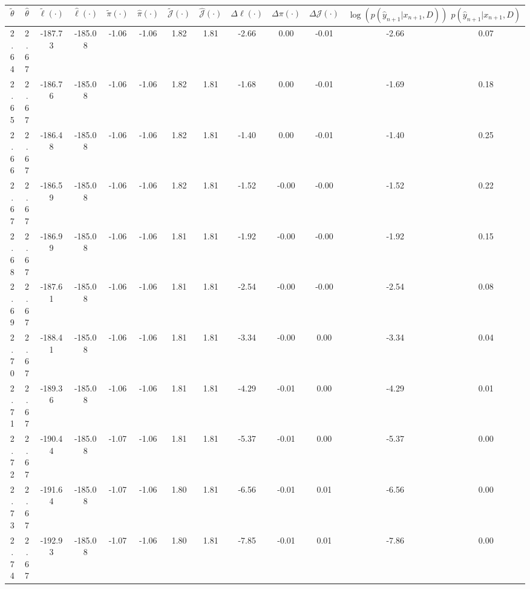 \begin{table}[htbp]
        \centering
        \tiny
        \begin{adjustbox}{angle=90}
            \begin{tabular}{|c|c|c|c|c|c|c|c|c|c|c|c|c|}
                \hline
                 $\tilde{\theta}$ & $\hat{\theta}$ & $\tilde{\ell}(\cdot)$ & $\hat{\ell}(\cdot)$ & $\tilde{\pi}(\cdot)$ & $\hat{\pi}(\cdot)$ & $\tilde{\mathcal{J}}(\cdot)$ & $\hat{\mathcal{J}}(\cdot)$ & $\Delta \ell(\cdot)$ & $\Delta \pi(\cdot)$ & $\Delta \mathcal{J}(\cdot)$ & $\log(p(\hat{y}_{n+1}|x_{n+1}, D))$ & $p(\hat{y}_{n+1}|x_{n+1}, D)$ \\
                \hline
                 2.64 & 2.67 & -187.73 & -185.08 & -1.06 & -1.06 & 1.82 & 1.81 & -2.66 & 0.00 & -0.01 & -2.66 & 0.07\\ \hline
 2.65 & 2.67 & -186.76 & -185.08 & -1.06 & -1.06 & 1.82 & 1.81 & -1.68 & 0.00 & -0.01 & -1.69 & 0.18\\ \hline
 2.66 & 2.67 & -186.48 & -185.08 & -1.06 & -1.06 & 1.82 & 1.81 & -1.40 & 0.00 & -0.01 & -1.40 & 0.25\\ \hline
 2.67 & 2.67 & -186.59 & -185.08 & -1.06 & -1.06 & 1.82 & 1.81 & -1.52 & -0.00 & -0.00 & -1.52 & 0.22\\ \hline
 2.68 & 2.67 & -186.99 & -185.08 & -1.06 & -1.06 & 1.81 & 1.81 & -1.92 & -0.00 & -0.00 & -1.92 & 0.15\\ \hline
 2.69 & 2.67 & -187.61 & -185.08 & -1.06 & -1.06 & 1.81 & 1.81 & -2.54 & -0.00 & -0.00 & -2.54 & 0.08\\ \hline
 2.70 & 2.67 & -188.41 & -185.08 & -1.06 & -1.06 & 1.81 & 1.81 & -3.34 & -0.00 & 0.00 & -3.34 & 0.04\\ \hline
 2.71 & 2.67 & -189.36 & -185.08 & -1.06 & -1.06 & 1.81 & 1.81 & -4.29 & -0.01 & 0.00 & -4.29 & 0.01\\ \hline
 2.72 & 2.67 & -190.44 & -185.08 & -1.07 & -1.06 & 1.81 & 1.81 & -5.37 & -0.01 & 0.00 & -5.37 & 0.00\\ \hline
 2.73 & 2.67 & -191.64 & -185.08 & -1.07 & -1.06 & 1.80 & 1.81 & -6.56 & -0.01 & 0.01 & -6.56 & 0.00\\ \hline
 2.74 & 2.67 & -192.93 & -185.08 & -1.07 & -1.06 & 1.80 & 1.81 & -7.85 & -0.01 & 0.01 & -7.86 & 0.00\\ \hline
            \end{tabular}
        \end{adjustbox}
        \caption{}
        \label{}
    \end{table}
    